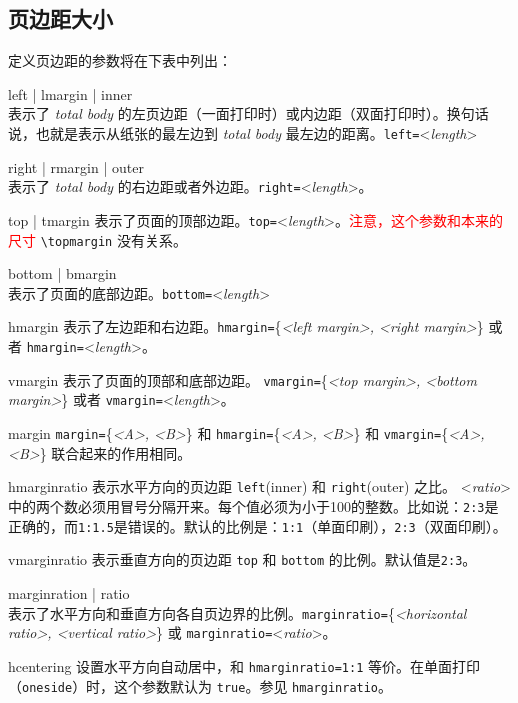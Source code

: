 \documentclass[titlepage]{ctexart}
\newcommand{\gpart}[1]{\textsf{\textsl{\color[rgb]{.0,.45,.7}#1}}}
\newenvironment{Options}%
  {\begin{list}{}{%
   \renewcommand{\makelabel}[1]{\texttt{##1}\hfil}%
   \setlength{\itemsep}{-.5\parsep}
   \settowidth{\labelwidth}{\texttt{xxxxxxxxxxx\space}}%
   \setlength{\leftmargin}{\labelwidth}%
   \addtolength{\leftmargin}{\labelsep}}%
   \raggedright}
  {\end{list}}
\begin{document}
	\subsection{页边距大小}\label{sec:margin}
	 定义页边距的参数将在下表中列出：
	 
	 \begin{Options}
	 \item[left | lmargin | inner]~\\
	 表示了 \gpart{total body} 的左页边距（一面打印时）或内边距（双面打印时）。换句话说，也就是表示从纸张的最左边到 \gpart{total body} 最左边的距离。\verb|left=|<\emph{length}>
	 \item[right | rmargin | outer]~\\
	 表示了 \gpart{total body} 的右边距或者外边距。\verb|right=|<\emph{length}>。
	 \item[top | tmargin] 表示了页面的顶部边距。\verb|top=|<\emph{length}>。\textcolor{red}{注意，这个参数和本来的尺寸} \verb|\topmargin| 没有关系。
	 \item[bottom | bmargin]~\\
	 表示了页面的底部边距。\verb|bottom=|<\emph{length}>
	 \item[hmargin]
	 表示了左边距和右边距。\verb|hmargin=|\{\emph{<left margin>, <right margin>}\} 或者 \verb|hmargin=|<\emph{length}>。
	 \item[vmargin] 表示了页面的顶部和底部边距。
	 \verb|vmargin=|\{\emph{<top margin>, <bottom margin>}\} 或者 \verb|vmargin=|<\emph{length}>。
	 \item[margin] \verb|margin=|\{\emph{<A>, <B>}\} 和 \verb|hmargin=|\{\emph{<A>, <B>}\} 和 \verb|vmargin=|\{\emph{<A>, <B>}\} 联合起来的作用相同。
	 \item[hmarginratio]
	  表示水平方向的页边距 \verb|left|(inner) 和 \verb|right|(outer) 之比。
	  <\emph{ratio}> 中的两个数必须用冒号分隔开来。每个值必须为小于100的整数。比如说：\verb|2:3|是正确的，而\verb|1:1.5|是错误的。默认的比例是：\verb|1:1|（单面印刷），\verb|2:3|（双面印刷）。
	  \item[vmarginratio]
	  表示垂直方向的页边距 \verb|top| 和 \verb|bottom| 的比例。默认值是\verb|2:3|。
	  \item[marginration | ratio]~\\
	  表示了水平方向和垂直方向各自页边界的比例。\verb|marginratio=|\{\emph{<horizontal ratio>, <vertical ratio>}\} 或 \verb|marginratio=|<\emph{ratio}>。
	  \item[hcentering] 设置水平方向自动居中，和 \verb|hmarginratio=1:1| 等价。在单面打印（\verb|oneside|）时，这个参数默认为 \verb|true|。参见 \verb|hmarginratio|。

\end{Options}
\end{document}
